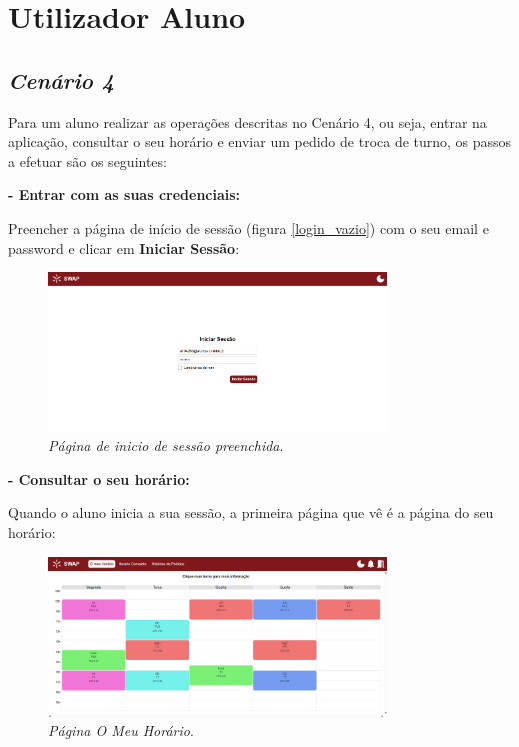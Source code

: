 \documentclass[12pt, a4paper]{article}
\begin{document}
\section*{Utilizador Aluno}

\subsection{\emph{Cenário 4}}

Para um aluno realizar as operações descritas no Cenário 4, ou seja, entrar na aplicação, consultar
o seu horário e enviar um pedido de troca de turno, os passos a efetuar são os seguintes:

\textbf{- Entrar com as suas credenciais:}

Preencher a página de início de sessão (figura \ref{login_vazio}) com o seu email e
password e clicar em \textbf{Iniciar Sessão}:

\begin{figure}[H]
    \centering
    \includegraphics[width=0.8\textwidth]{res/manual/pagina_login_preenchida.png}
    \caption{\emph{Página de inicio de sessão preenchida}.}
    \label{login_preenchido}
\end{figure}

\textbf{- Consultar o seu horário:}

Quando o aluno inicia a sua sessão, a primeira página que vê é a página do seu horário:

\begin{figure}[H]
    \centering
    \includegraphics[width=0.8\textwidth]{res/manual/pagina_o_meu_horario.png}
    \caption{\emph{Página O Meu Horário}.}
    \label{meu_horario}
\end{figure}
\end{document}
